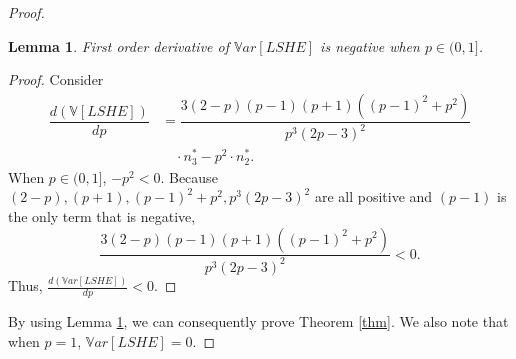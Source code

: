 \documentclass{imsart}
\newtheorem{lemma}{Lemma}
\begin{document}
\begin{proof}
	\begin{lemma}
		\label{lemma}
		First order derivative of $\mathbb{V}ar[LSHE]$ is negative when $p \in (0,1]$.
	\end{lemma}
	\begin{proof}
	Consider
	\begin{align*}
	\dfrac{d(\mathbb{V}[LSHE])}{dp} &= \dfrac{3(2-p)(p-1)(p+1)((p-1)^2+p^2)}{p^3(2p-3)^2} \\ &\quad \cdot n_3^*
	-p^2 \cdot n_2^*.
	\end{align*}
	When $p\in(0,1]$,  $-p^2 <0$. Because $(2-p), (p+1), (p-1)^2+p^2,p^3(2p-3)^2$ are all positive and $(p-1)$ is the only term that is negative, $$\frac{3(2-p)(p-1)(p+1)((p-1)^2+p^2)}{p^3(2p-3)^2} < 0.$$ Thus, $\frac{d(\mathbb{V}ar[LSHE])}{dp} < 0$.
\end{proof}
	By using Lemma \ref{lemma}, we can consequently prove Theorem \ref{thm}. We also note that when $p=1$, $\mathbb{V}ar[LSHE] = 0$.
\end{proof}
%
%
\end{document}
